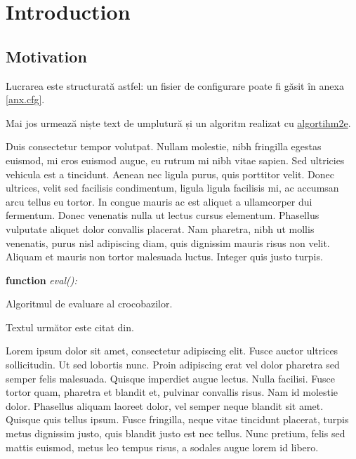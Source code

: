 \chapter{Introduction}

\section{Motivation}

Lucrarea este structurată astfel: un fisier de configurare poate fi găsit în
anexa \ref{anx.cfg}.

Mai jos urmează niște text de umplutură și un algoritm realizat cu
\href{http://www.ctan.org/tex-archive/macros/latex/contrib/algorithm2e/algorithm2e.pdf}{algortihm2e}.

Duis consectetur tempor volutpat. Nullam molestie, nibh fringilla egestas
euismod, mi eros euismod augue, eu rutrum mi nibh vitae sapien. Sed ultricies
vehicula est a tincidunt. Aenean nec ligula purus, quis porttitor velit. Donec
ultrices, velit sed facilisis condimentum, ligula ligula facilisis mi, ac
accumsan arcu tellus eu tortor. In congue mauris ac est aliquet a ullamcorper
dui fermentum. Donec venenatis nulla ut lectus cursus elementum. Phasellus
vulputate aliquet dolor convallis placerat. Nam pharetra, nibh ut mollis
venenatis, purus nisl adipiscing diam, quis dignissim mauris risus non velit.
Aliquam et mauris non tortor malesuada luctus. Integer quis justo turpis.


\SetEndCharOfAlgoLine{}
\begin{algorithm}[htb]
	
	\textbf{function} \emph{eval():}\;
	\caption{Algoritmul de evaluare al crocobazilor.}
\end{algorithm}

Textul următor este citat din.

Lorem ipsum dolor sit amet, consectetur adipiscing elit. Fusce auctor ultrices
sollicitudin. Ut sed lobortis nunc. Proin adipiscing erat vel dolor pharetra
sed semper felis malesuada. Quisque imperdiet augue lectus. Nulla facilisi.
Fusce tortor quam, pharetra et blandit et, pulvinar convallis risus. Nam id
molestie dolor. Phasellus aliquam laoreet dolor, vel semper neque blandit sit
amet. Quisque quis tellus ipsum. Fusce fringilla, neque vitae tincidunt
placerat, turpis metus dignissim justo, quis blandit justo est nec tellus. Nunc
pretium, felis sed mattis euismod, metus leo tempus risus, a sodales augue
lorem id libero.

